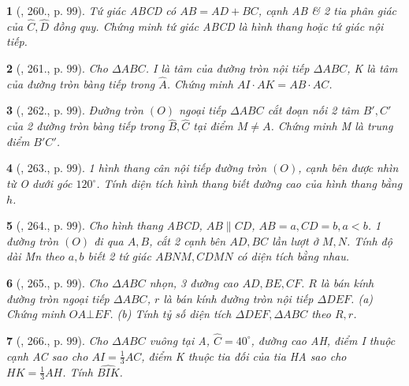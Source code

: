 \documentclass{article}
\newtheorem{baitoan}{}
\begin{document}
\begin{baitoan}[\cite{Binh_Toan_9_tap_2}, 260., p. 99]
	Tứ giác ABCD có $AB = AD + BC$, cạnh AB \& 2 tia phân giác của $\widehat{C},\widehat{D}$ đồng quy. Chứng minh tứ giác ABCD là hình thang hoặc tứ giác nội tiếp.
\end{baitoan}

\begin{baitoan}[\cite{Binh_Toan_9_tap_2}, 261., p. 99]
	Cho $\Delta ABC$. I là tâm của đường tròn nội tiếp $\Delta ABC$, K là tâm của đường tròn bàng tiếp trong $\widehat{A}$. Chứng minh $AI\cdot AK = AB\cdot AC$.
\end{baitoan}

\begin{baitoan}[\cite{Binh_Toan_9_tap_2}, 262., p. 99]
	Đường tròn $(O)$ ngoại tiếp $\Delta ABC$ cắt đoạn nối 2 tâm $B',C'$ của 2 đường tròn bàng tiếp trong $\widehat{B},\widehat{C}$ tại điểm $M\ne A$. Chứng minh M là trung điểm $B'C'$.
\end{baitoan}

\begin{baitoan}[\cite{Binh_Toan_9_tap_2}, 263., p. 99]
	1 hình thang cân nội tiếp đường tròn $(O)$, cạnh bên được nhìn từ O dưới góc $120^\circ$. Tính diện tích hình thang biết đường cao của hình thang bằng $h$.
\end{baitoan}

\begin{baitoan}[\cite{Binh_Toan_9_tap_2}, 264., p. 99]
	Cho hình thang ABCD, $AB\parallel CD$, $AB = a,CD = b,a < b$. 1 đường tròn $(O)$ đi qua $A,B$, cắt 2 cạnh bên $AD,BC$ lần lượt ở $M,N$. Tính độ dài Mn theo $a,b$ biết 2 tứ giác $ABNM,CDMN$ có diện tích bằng nhau.
\end{baitoan}

\begin{baitoan}[\cite{Binh_Toan_9_tap_2}, 265., p. 99]
	Cho $\Delta ABC$ nhọn, 3 đường cao $AD,BE,CF$. $R$ là bán kính đường tròn ngoại tiếp $\Delta ABC$, $r$ là bán kính đường tròn nội tiếp $\Delta DEF$. (a) Chứng minh $OA\bot EF$. (b) Tính tỷ số diện tích $\Delta DEF,\Delta ABC$ theo $R,r$.
\end{baitoan}

\begin{baitoan}[\cite{Binh_Toan_9_tap_2}, 266., p. 99]
	Cho $\Delta ABC$ vuông tại A, $\widehat{C} = 40^\circ$, đường cao AH, điểm I thuộc cạnh AC sao cho $AI = \frac{1}{3}AC$, điểm K thuộc tia đối của tia HA sao cho $HK = \frac{1}{3}AH$. Tính $\widehat{BIK}$.
\end{baitoan}
\end{document}
